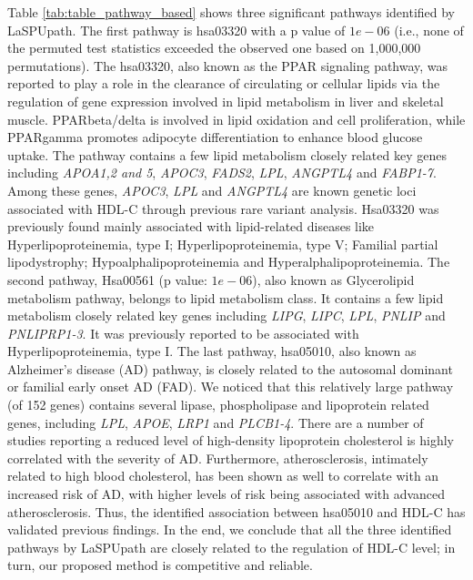\documentclass[12pt]{article}
\begin{document}
Table \ref{tab:table_pathway_based} shows three significant pathways identified by LaSPUpath. The first pathway is hsa03320 with a p value of $1e-06$ (i.e., none of the permuted test statistics exceeded the observed one based on 1,000,000 permutations). The hsa03320, also known as the PPAR signaling pathway, was reported to play a role in the clearance of circulating or cellular lipids via the regulation of gene expression involved in lipid metabolism in liver and skeletal muscle. PPARbeta/delta is involved in lipid oxidation and cell proliferation, while PPARgamma promotes adipocyte differentiation to enhance blood glucose uptake. The pathway contains a few lipid metabolism closely related key genes including \textit{APOA1,2 and 5}, \textit{APOC3}, \textit{FADS2}, \textit{LPL}, \textit{ANGPTL4} and \textit{FABP1-7}. Among these genes, \textit{APOC3}, \textit{LPL} and \textit{ANGPTL4} are known genetic loci associated with HDL-C through previous rare variant analysis.\cite{Peloso2014} Hsa03320 was previously found mainly associated with lipid-related diseases like Hyperlipoproteinemia, type I; Hyperlipoproteinemia, type V; Familial partial lipodystrophy; Hypoalphalipoproteinemia and Hyperalphalipoproteinemia. The second pathway, Hsa00561 (p value: $1e-06$), also known as Glycerolipid metabolism pathway, belongs to lipid metabolism class. It contains a few lipid metabolism closely related key genes including \textit{LIPG}, \textit{LIPC}, \textit{LPL}, \textit{PNLIP} and \textit{PNLIPRP1-3}. It was previously reported to be associated with Hyperlipoproteinemia, type I. The last pathway, hsa05010, also known as Alzheimer's disease (AD) pathway, is closely related to the autosomal dominant or familial early onset AD (FAD). We noticed that this relatively large pathway (of 152 genes) contains several lipase, phospholipase and lipoprotein related genes, including \textit{LPL}, \textit{APOE}, \textit{LRP1} and \textit{PLCB1-4}. There are a number of studies reporting a reduced level of high-density lipoprotein cholesterol is highly correlated with the severity of AD.\cite{Fernandes1999,Merched2000,Michikawa2003,Puglielli2003} Furthermore, atherosclerosis, intimately related to high blood cholesterol, has been shown as well to correlate with an increased risk of AD, with higher levels of risk being associated with advanced atherosclerosis.\cite{Hofman1997,Casserly2004} Thus, the identified association between hsa05010 and HDL-C has validated previous findings. In the end, we conclude that all the three identified pathways by LaSPUpath are closely related to the regulation of HDL-C level; in turn, our proposed method is competitive and reliable.
\end{document}
